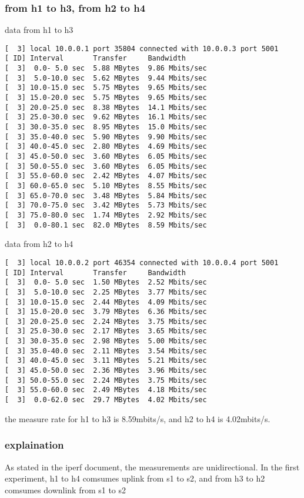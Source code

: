 \documentclass[11pt]{article}
\begin{document}
\subsubsection{from h1 to h3, from h2 to h4}
\label{sec:org0de6b76}
data from h1 to h3
\begin{verbatim}
[  3] local 10.0.0.1 port 35804 connected with 10.0.0.3 port 5001
[ ID] Interval       Transfer     Bandwidth
[  3]  0.0- 5.0 sec  5.88 MBytes  9.86 Mbits/sec
[  3]  5.0-10.0 sec  5.62 MBytes  9.44 Mbits/sec
[  3] 10.0-15.0 sec  5.75 MBytes  9.65 Mbits/sec
[  3] 15.0-20.0 sec  5.75 MBytes  9.65 Mbits/sec
[  3] 20.0-25.0 sec  8.38 MBytes  14.1 Mbits/sec
[  3] 25.0-30.0 sec  9.62 MBytes  16.1 Mbits/sec
[  3] 30.0-35.0 sec  8.95 MBytes  15.0 Mbits/sec
[  3] 35.0-40.0 sec  5.90 MBytes  9.90 Mbits/sec
[  3] 40.0-45.0 sec  2.80 MBytes  4.69 Mbits/sec
[  3] 45.0-50.0 sec  3.60 MBytes  6.05 Mbits/sec
[  3] 50.0-55.0 sec  3.60 MBytes  6.05 Mbits/sec
[  3] 55.0-60.0 sec  2.42 MBytes  4.07 Mbits/sec
[  3] 60.0-65.0 sec  5.10 MBytes  8.55 Mbits/sec
[  3] 65.0-70.0 sec  3.48 MBytes  5.84 Mbits/sec
[  3] 70.0-75.0 sec  3.42 MBytes  5.73 Mbits/sec
[  3] 75.0-80.0 sec  1.74 MBytes  2.92 Mbits/sec
[  3]  0.0-80.1 sec  82.0 MBytes  8.59 Mbits/sec
\end{verbatim}
data from h2 to h4
\begin{verbatim}
[  3] local 10.0.0.2 port 46354 connected with 10.0.0.4 port 5001
[ ID] Interval       Transfer     Bandwidth
[  3]  0.0- 5.0 sec  1.50 MBytes  2.52 Mbits/sec
[  3]  5.0-10.0 sec  2.25 MBytes  3.77 Mbits/sec
[  3] 10.0-15.0 sec  2.44 MBytes  4.09 Mbits/sec
[  3] 15.0-20.0 sec  3.79 MBytes  6.36 Mbits/sec
[  3] 20.0-25.0 sec  2.24 MBytes  3.75 Mbits/sec
[  3] 25.0-30.0 sec  2.17 MBytes  3.65 Mbits/sec
[  3] 30.0-35.0 sec  2.98 MBytes  5.00 Mbits/sec
[  3] 35.0-40.0 sec  2.11 MBytes  3.54 Mbits/sec
[  3] 40.0-45.0 sec  3.11 MBytes  5.21 Mbits/sec
[  3] 45.0-50.0 sec  2.36 MBytes  3.96 Mbits/sec
[  3] 50.0-55.0 sec  2.24 MBytes  3.75 Mbits/sec
[  3] 55.0-60.0 sec  2.49 MBytes  4.18 Mbits/sec
[  3]  0.0-62.0 sec  29.7 MBytes  4.02 Mbits/sec
\end{verbatim}
the measure rate for h1 to h3 is 8.59mbits/s, and h2 to h4 is 4.02mbits/s.
\subsubsection{explaination}
\label{sec:org88cde30}
As stated in the iperf document, the measurements are unidirectional. In the first experiment,
h1 to h4 comsumes uplink from s1 to s2, and from h3 to h2 comsumes downlink from s1 to s2
\end{document}
